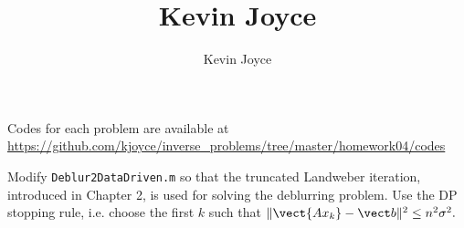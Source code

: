 \documentclass{homework}
\title{Kevin Joyce}
\author{Kevin Joyce}
\begin{document}
 
\newcommand{\figref}[1]{\figurename~\ref{#1}}
\renewcommand{\bar}{\overline}
\renewcommand{\hat}{\widehat}
\renewcommand{\SS}{\mathcal S}
\newcommand{\HH}{\mathscr H}
\newcommand{\mom}{\widetilde}
\newcommand{\mle}{\widehat \Uptheta}
\newcommand{\eps}{\varepsilon}
\newcommand{\todist}{\stackrel{D}\longrightarrow}
\newcommand{\toprob}{\stackrel{p}\longrightarrow}
\newcommand{\TTheta}{\overline{\underline \Theta} }
\newcommand{\del}{\partial}
\newcommand{\approxsim}{\overset{\cdotp}{\underset{\cdotp}{\sim}}}

Codes for each problem are available at \url{https://github.com/kjoyce/inverse_problems/tree/master/homework04/codes}

\begin{longproblem}



\end{longproblem}

\begin{longproblem}
Modify \texttt{Deblur2DataDriven.m} so that the truncated Landweber iteration, introduced in Chapter 2, is used for solving the deblurring problem.  Use the DP stopping rule, i.e. choose the first $k$ such that $\|\vect{Ax_k} - \vect b\|^2 \le n^2\sigma^2.$
\end{longproblem}
\end{document}
